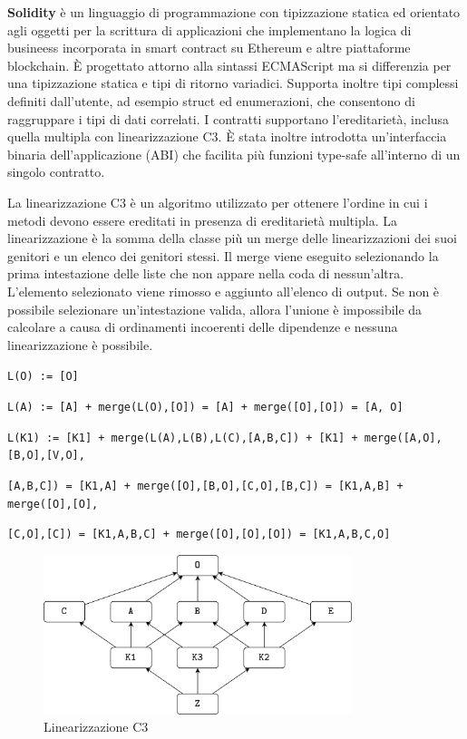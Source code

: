 \textbf{Solidity} è un linguaggio di programmazione con tipizzazione statica ed orientato agli oggetti per la scrittura di applicazioni che implementano la logica di busineess incorporata in smart contract su Ethereum e altre piattaforme blockchain. È progettato attorno alla sintassi ECMAScript ma si differenzia per una tipizzazione statica e tipi di ritorno variadici. Supporta inoltre tipi complessi definiti dall'utente, ad esempio struct ed enumerazioni, che consentono di raggruppare i tipi di dati correlati. I contratti supportano l'ereditarietà, inclusa quella multipla con linearizzazione C3. È stata inoltre introdotta un'interfaccia binaria dell'applicazione (ABI) che facilita più funzioni type-safe all'interno di un singolo contratto.

\begin{mdframed}[backgroundcolor=gray!20,shadow=false]

La linearizzazione C3 è un algoritmo utilizzato per ottenere l'ordine in cui i metodi devono essere ereditati in presenza di ereditarietà multipla. La linearizzazione è la somma della classe più un merge delle linearizzazioni dei suoi genitori e un elenco dei genitori stessi. Il merge viene eseguito selezionando la prima intestazione delle liste che non appare nella coda di nessun'altra. L'elemento selezionato viene rimosso e aggiunto all'elenco di output. Se non è possibile selezionare un'intestazione valida, allora l'unione è impossibile da calcolare a causa di ordinamenti incoerenti delle dipendenze e nessuna linearizzazione è possibile.

\texttt{L(O) := [O]}

\texttt{L(A) := [A] + merge(L(O),[O]) = [A] + merge([O],[O]) = [A, O]}

\texttt{L(K1) := [K1] + merge(L(A),L(B),L(C),[A,B,C]) + [K1] + merge([A,O],[B,O],[V,O],}

\texttt{[A,B,C]) = [K1,A] + merge([O],[B,O],[C,O],[B,C]) = [K1,A,B] + merge([O],[O],}

\texttt{[C,O],[C]) = [K1,A,B,C] + merge([O],[O],[O]) = [K1,A,B,C,O]}

\end{mdframed}

\begin{figure}[htb!]
    \centering
    \includegraphics[width=9cm]{./Images/cap3/3.14.png}
    \caption{Linearizzazione C3}
\end{figure}

